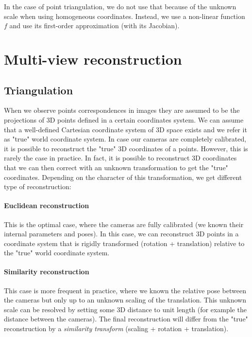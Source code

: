 In the case of point triangulation, we do not use that because of the unknown scale when using homogeneous coordinates. Instead, we use a non-linear function $f$ and use its first-order approximation (with its Jacobian).




\section{Multi-view reconstruction}

\subsection{Triangulation}

When we observe points correspondences in images they are assumed to be the projections of 3D points defined in a certain coordinates system. We can assume that a well-defined Cartesian coordinate system of 3D space exists and we refer it as "true" world coordinate system. 
In case our cameras are completely calibrated, it is possible to reconstruct the "true" 3D coordinates of a points. However, this is rarely the case in practice. In fact, it is possible to reconstruct 3D coordinates that we can then correct with an unknown transformation to get the "true" coordinates. Depending on the character of this transformation, we get different type of reconstruction:

\paragraph{Euclidean reconstruction}
This is the optimal case, where the cameras are fully calibrated (we known their internal parameters and poses). In this case, we can reconstruct 3D points in a coordinate system that is rigidly transformed (rotation + translation) relative to the "true" world coordinate system.

\paragraph{Similarity reconstruction}
This case is more frequent in practice, where we known the relative pose between the cameras but only up to an unknown scaling of the translation. This unknown scale can be resolved by setting some 3D distance to unit length (for example the distance between the cameras).
The final reconstruction will differ from the "true" reconstruction by a \textit{similarity transform} (scaling + rotation + translation).

